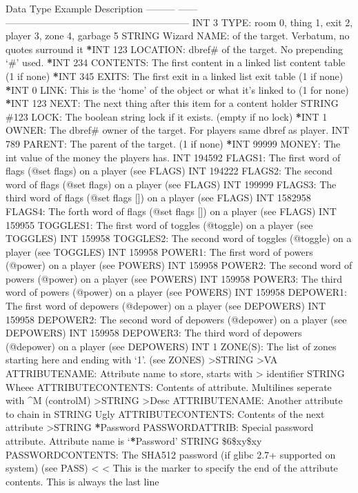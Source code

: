 \documentclass[letterpaper,10pt,english]{sphinxmanual}
\begin{document}
\sphinxAtStartPar
Data Type  Example  Description
———  ——\sphinxhyphen{}  ———————————————————\sphinxhyphen{}
INT        3        TYPE: room 0, thing 1, exit 2, player 3, zone 4, garbage 5
STRING     Wizard   NAME: of the target.  Verbatum, no quotes surround it
{\color{red}\bfseries{}*}INT       123      LOCATION: dbref\# of the target.  No prepending ‘\#’ used.
{\color{red}\bfseries{}*}INT       234      CONTENTS: The first content in a linked list content table (\sphinxhyphen{}1 if none)
{\color{red}\bfseries{}*}INT       345      EXITS: The first exit in a linked list exit table (\sphinxhyphen{}1 if none)
{\color{red}\bfseries{}*}INT       0        LINK: This is the ‘home’ of the object or what it’s linked to (\sphinxhyphen{}1 for none)
{\color{red}\bfseries{}*}INT       123      NEXT: The next thing after this item for a content holder
STRING     \#123     LOCK: The boolean string lock if it exists.  (empty if no lock)
{\color{red}\bfseries{}*}INT       1        OWNER: The dbref\# owner of the target.  For players same dbref as player.
INT        789      PARENT: The parent of the target.  (\sphinxhyphen{}1 if none)
{\color{red}\bfseries{}*}INT       99999    MONEY: The int value of the money the players has.
INT        194592   FLAGS1: The first word of flags (@set flags) on a player      (see FLAGS)
INT        194222   FLAGS2: The second word of flags (@set flags) on a player     (see FLAGS)
INT        199999   FLAGS3: The third word of flags (@set flags {[}{]}) on a player   (see FLAGS)
INT        1582958  FLAGS4: The forth word of flags (@set flags {[}{]}) on a player   (see FLAGS)
INT        159955   TOGGLES1: The first word of toggles (@toggle) on a player    (see TOGGLES)
INT        159958   TOGGLES2: The second word of toggles (@toggle) on a player   (see TOGGLES)
INT        159958   POWER1: The first word of powers (@power) on a player         (see POWERS)
INT        159958   POWER2: The second word of powers (@power) on a player        (see POWERS)
INT        159958   POWER3: The third word of powers (@power) on a player         (see POWERS)
INT        159958   DEPOWER1: The first word of depowers (@depower) on a player  (see DEPOWERS)
INT        159958   DEPOWER2: The second word of depowers (@depower) on a player (see DEPOWERS)
INT        159958   DEPOWER3: The third word of depowers (@depower) on a player  (see DEPOWERS)
INT        \sphinxhyphen{}1       ZONE(S): The list of zones starting here and ending with ‘\sphinxhyphen{}1’. (see ZONES)
\textgreater{}STRING    \textgreater{}VA      ATTRIBUTENAME: Attribute name to store, starts with \textgreater{} identifier
STRING     Wheee    ATTRIBUTECONTENTS: Contents of attribute.  Multi\sphinxhyphen{}lines seperate with \textasciicircum{}M (control\sphinxhyphen{}M)
\textgreater{}STRING    \textgreater{}Desc    ATTRIBUTENAME: Another attribute to chain in
STRING     Ugly     ATTRIBUTECONTENTS: Contents of the next attribute
\textgreater{}STRING    {\color{red}\bfseries{}*}Password PASSWORDATTRIB: Special password attribute.  Attribute name is ‘{\color{red}\bfseries{}*}Password’
STRING     \$6\$xy\$xy PASSWORDCONTENTS: The SHA512 password (if glibc 2.7+ supported on system) (see PASS)
\textless{}          \textless{}        This is the marker to specify the end of the attribute contents.  This is always the last line
\end{document}
